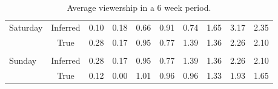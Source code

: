 \begin{table}[H]
\begin{tabular}{lccccccccc}
\multicolumn{1}{l|}{\multirow{2}{*}{Saturday}}  & \multicolumn{1}{c|}{Inferred} & \multicolumn{1}{c|}{0.10}           & \multicolumn{1}{c|}{0.18}           & \multicolumn{1}{c|}{0.66}           & \multicolumn{1}{c|}{0.91}           & \multicolumn{1}{c|}{0.74}           & \multicolumn{1}{c|}{1.65}           & \multicolumn{1}{c|}{3.17}           & \multicolumn{1}{c|}{2.35}           \\ \cline{2-10} 
\multicolumn{1}{l|}{}                           & \multicolumn{1}{c|}{True}     & \multicolumn{1}{c|}{0.28}           & \multicolumn{1}{c|}{0.17}           & \multicolumn{1}{c|}{0.95}           & \multicolumn{1}{c|}{0.77}           & \multicolumn{1}{c|}{1.39}           & \multicolumn{1}{c|}{1.36}           & \multicolumn{1}{c|}{2.26}           & \multicolumn{1}{c|}{2.10}           \\ \cline{2-10} 
                                                &                               &                                     &                                     &                                     &                                     &                                     &                                     &                                     &                                     \\ \cline{2-10} 
\multicolumn{1}{l|}{\multirow{2}{*}{Sunday}}    & \multicolumn{1}{c|}{Inferred} & \multicolumn{1}{c|}{0.28}           & \multicolumn{1}{c|}{0.17}           & \multicolumn{1}{c|}{0.95}           & \multicolumn{1}{c|}{0.77}           & \multicolumn{1}{c|}{1.39}           & \multicolumn{1}{c|}{1.36}           & \multicolumn{1}{c|}{2.26}           & \multicolumn{1}{c|}{2.10}           \\ \cline{2-10} 
\multicolumn{1}{l|}{}                           & \multicolumn{1}{c|}{True}     & \multicolumn{1}{c|}{0.12}           & \multicolumn{1}{c|}{0.00}           & \multicolumn{1}{c|}{1.01}           & \multicolumn{1}{c|}{0.96}           & \multicolumn{1}{c|}{0.96}           & \multicolumn{1}{c|}{1.33}           & \multicolumn{1}{c|}{1.93}           & \multicolumn{1}{c|}{1.65}           \\ \cline{2-10} 
\end{tabular}
\caption{Average viewership in a 6 week period.}
\label{tab:CaseRes}
\end{table}